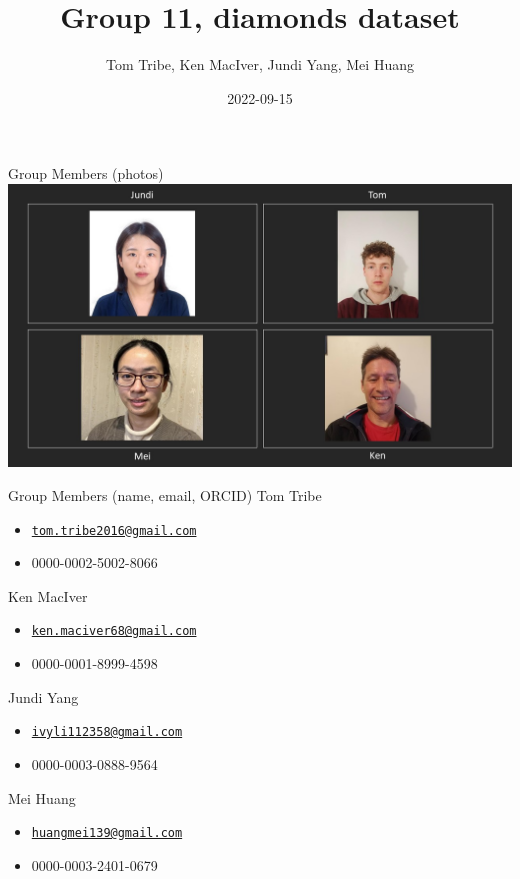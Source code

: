 \documentclass[
  ignorenonframetext,
]{beamer}
\title{Group 11, diamonds dataset}
\author{Tom Tribe, Ken MacIver, Jundi Yang, Mei Huang}
\date{2022-09-15}
\providecommand{\tightlist}{%
  \setlength{\itemsep}{0pt}\setlength{\parskip}{0pt}}
\begin{document}
\frame{\titlepage}

\begin{frame}{Group Members (photos)}
\protect\hypertarget{group-members-photos}{}
\includegraphics{./Photos3.jpg}
\end{frame}

\begin{frame}{Group Members (name, email, ORCID)}
\protect\hypertarget{group-members-name-email-orcid}{}
Tom Tribe

\begin{itemize}
\tightlist
\item
  \href{mailto:tom.tribe2016@gmail.com}{\nolinkurl{tom.tribe2016@gmail.com}}
\item
  0000-0002-5002-8066
\end{itemize}

Ken MacIver

\begin{itemize}
\tightlist
\item
  \href{mailto:ken.maciver68@gmail.com}{\nolinkurl{ken.maciver68@gmail.com}}
\item
  0000-0001-8999-4598
\end{itemize}

Jundi Yang

\begin{itemize}
\tightlist
\item
  \href{mailto:ivyli112358@gmail.com}{\nolinkurl{ivyli112358@gmail.com}}
\item
  0000-0003-0888-9564
\end{itemize}

Mei Huang

\begin{itemize}
\tightlist
\item
  \href{mailto:huangmei139@gmail.com}{\nolinkurl{huangmei139@gmail.com}}
\item
  0000-0003-2401-0679
\end{itemize}
\end{frame}
\end{document}
